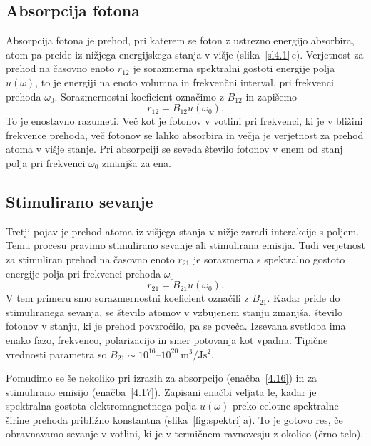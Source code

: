 \subsection*{Absorpcija fotona}
Absorpcija fotona je prehod, pri katerem se foton 
z ustrezno energijo absorbira, atom pa preide iz nižjega energijskega stanja v višje (slika~\ref{sl4.1}\,c). 
Verjetnost za prehod na časovno enoto $r_{12}$ je sorazmerna 
spektralni gostoti energije polja $u(\omega)$, to je
energiji na enoto volumna in frekvenčni interval, 
pri frekvenci prehoda $\omega_{0}$. Sorazmernostni koeficient označimo z $B_{12}$ in 
zapišemo
\begin{equation}
r_{12}=B_{12}u(\omega_{0}).
\label{4.16}
\end{equation}
To je enostavno razumeti. Več kot je fotonov v votlini pri frekvenci, ki je
v bližini frekvence prehoda, več fotonov se lahko absorbira in večja je 
verjetnost za prehod atoma v višje stanje. Pri absorpciji se
seveda število fotonov v enem od stanj polja pri frekvenci
$\omega_{0}$ zmanjša za ena.

\subsection*{Stimulirano sevanje}
Tretji pojav je prehod atoma iz višjega stanja v nižje zaradi interakcije
s poljem. Temu procesu pravimo stimulirano sevanje ali 
stimulirana emisija. Tudi verjetnost za stimuliran prehod na časovno enoto $r_{21}$ 
je sorazmerna s spektralno gostoto energije polja pri frekvenci prehoda $\omega_{0}$
\begin{equation}
r_{21}=B_{21}u(\omega_{0}).
\label{4.17}
\end{equation}
V tem primeru smo sorazmernostni koeficient označili z $B_{21}$. Kadar pride do
stimuliranega sevanja, se število atomov v vzbujenem stanju zmanjša, 
število fotonov v stanju, ki je prehod povzročilo, pa se poveča. 
Izsevana svetloba ima enako fazo, frekvenco, polarizacijo in smer potovanja kot 
vpadna. Tipične vrednosti parametra so $B_{21} \sim 10^{16}$--$10^{20}~\si{\metre^3/\joule\second^2}$.

Pomudimo se še nekoliko pri izrazih za absorpcijo
(enačba~\ref{4.16}) in za stimulirano emisijo (enačba~\ref{4.17}).
Zapisani enačbi veljata le, kadar je spektralna gostota 
elektromagnetnega polja $u(\omega)$
preko celotne spektralne širine prehoda približno konstantna 
(slika~\ref{fig:spektri}\,a). To je gotovo res, če
obravnavamo sevanje v votlini, ki je v termičnem ravnovesju z okolico (črno telo).


